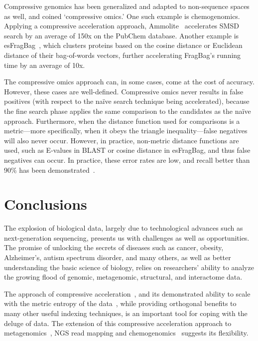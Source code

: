 \documentclass{acm_proc_article-sp}
\begin{document}
Compressive genomics \cite{loh2012compressive} has been
generalized and adapted to non-sequence spaces as well, and coined
`compressive omics.'
One such example is chemogenomics.
Applying a compressive acceleration approach, Ammolite~\cite{yu2015entropy}
accelerates SMSD search by an average of 150x on the PubChem database.
Another example is 
esFragBag~\cite{yu2015entropy}, which clusters proteins based on the cosine distance or
Euclidean distance of their bag-of-words vectors, further accelerating FragBag's
running time by an average of 10x.

The compressive omics approach can, in some cases, come at the cost of accuracy.
However, these cases are well-defined.
Compressive omics never results in false positives (with respect to the na\"ive 
search technique being accelerated), because the fine search phase applies the
same comparison to the candidates as the na\"ive approach.
Furthermore, when the distance function used for comparisons is a metric---more specifically, when it obeys the triangle inequality---false negatives will also
never occur.
However, in practice, non-metric distance functions are used, such as E-values
in BLAST or cosine distance in esFragBag, and thus false negatives can occur.
In practice, these error rates are low, and recall better than 90\% has been
demonstrated~\cite{loh2012compressive,daniels2013compressive,yu2015entropy}.

\section{Conclusions}

The explosion of biological data, largely due to technological advances such as
next-generation sequencing, presents us with challenges as well as 
opportunities.
The promise of unlocking the secrets of diseases such as cancer, obesity,
Alzheimer's, autism spectrum disorder, and many others, as well as better 
understanding the basic science of biology, relies on researchers' ability to 
analyze the growing flood of genomic, metagenomic, structural, and interactome 
data.

The approach of compressive acceleration~\cite{loh2012compressive}, and its 
demonstrated ability to scale with the metric entropy of the 
data~\cite{yu2015entropy}, while providing orthogonal benefits to many other
useful indexing techniques, is an important tool for coping with the deluge of
data.
The extension of this compressive acceleration approach to 
metagenomics~\cite{yu2015entropy}, NGS read 
mapping and chemogenomics~\cite{yorukoglu2015compressive} suggests its 
flexibility.
\end{document}
